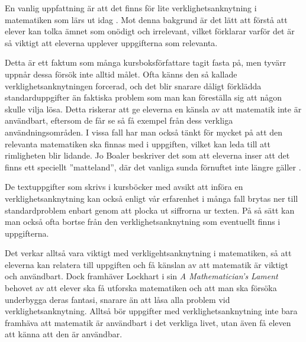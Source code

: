 \textcolor{lila}{En vanlig uppfattning är att det finns för lite verklighetsanknytning i matematiken som lärs ut idag \cite{TheElephant}. Mot denna bakgrund är det lätt att förstå att elever kan tolka ämnet som onödigt och irrelevant, vilket förklarar varför det är så viktigt att eleverna upplever uppgifterna som relevanta.}

\textcolor{lila}{Detta är ett faktum som många kursboksförfattare tagit fasta på, men tyvärr uppnår dessa försök inte alltid målet. Ofta känns den så kallade verklighetsanknytningen forcerad, och det blir snarare dåligt förklädda standarduppgifter än faktiska problem som man kan föreställa sig att någon skulle vilja lösa. Detta riskerar att ge eleverna en känsla av att matematik inte är användbart, eftersom de får se så få exempel från dess verkliga användningsområden.
I vissa fall har man också tänkt för mycket på att den relevanta matematiken ska finnas med i uppgiften, vilket kan leda till att rimligheten blir lidande. Jo Boaler beskriver det som att eleverna inser att det finns ett speciellt ''matteland'', där det vanliga sunda förnuftet inte längre gäller \cite{TheElephant}.}
    
\textcolor{lila}{De textuppgifter som skrivs  i kursböcker med avsikt att införa en verklighetsanknytning kan också enligt vår erfarenhet i många fall brytas ner till standardproblem enbart genom att plocka ut siffrorna ur texten. På så sätt kan man också ofta bortse från den verklighetsanknytning som eventuellt finns i uppgifterna.}

\textcolor{lila}{Det verkar alltså vara viktigt med verkligehtsanknytning i matematiken, så att eleverna kan relatera till uppgiften och få känslan av att matematik är viktigt och användbart.} \textcolor{Mahogany}{Dock framhäver Lockhart i sin \textsl{A Mathematician's Lament} \cite{lockhart} behovet av att elever ska få utforska matematiken och att man ska försöka underbygga deras fantasi, snarare än att låsa alla problem vid verklighetsanknytning. Alltså bör uppgifter med verklighetsanknytning inte bara framhäva att matematik är användbart i det verkliga livet, utan även få eleven att känna att den är användbar.}